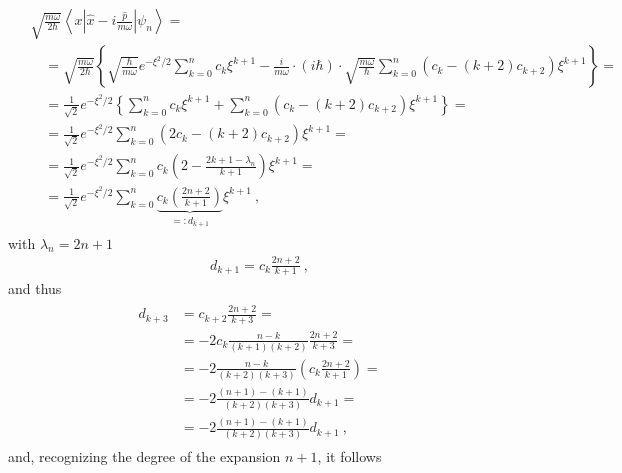 \documentclass[letterpaper,10pt,english]{jupyterBook}
\begin{document}
\begin{equation*}
\begin{split}\begin{aligned}
  & \sqrt{\frac{m \omega}{2 \hbar}} \left\langle x \left| \hat{x} - i \frac{\hat{p}}{m \omega} \right| \psi_n \right\rangle = \\
  & \quad = \sqrt{\frac{m \omega}{2 \hbar}} \left\{ \sqrt{\frac{\hbar}{m \omega}} e^{-\xi^2/2} \sum_{k=0}^{n} c_k \xi^{k+1} - \frac{i}{m \omega} \cdot \left( i \hbar \right) \cdot\sqrt{\frac{m\omega}{\hbar}} \sum_{k=0}^{n} \left( c_k - (k+2) c_{k+2} \right) \xi^{k+1} \right\} = \\
  & \quad = \frac{1}{\sqrt{2}} e^{-\xi^2/2} \left\{ \sum_{k=0}^{n} c_k \xi^{k+1} + \sum_{k=0}^{n} \left( c_k - (k+2) c_{k+2} \right) \xi^{k+1} \right\} = \\
  & \quad = \frac{1}{\sqrt{2}} e^{-\xi^2/2} \sum_{k=0}^{n} \left( 2 c_k - (k+2) c_{k+2} \right) \xi^{k+1} = \\
  & \quad = \frac{1}{\sqrt{2}} e^{-\xi^2/2} \sum_{k=0}^{n} c_k \left( 2 - \frac{2k+1-\lambda_n}{k+1} \right) \xi^{k+1} = \\
  & \quad = \frac{1}{\sqrt{2}} e^{-\xi^2/2} \sum_{k=0}^{n} \underbrace{c_k \left( \frac{2 n + 2}{k+1} \right)}_{=:d_{k+1}} \xi^{k+1} \ ,
\end{aligned}\end{split}
\end{equation*}
\sphinxAtStartPar
with \(\lambda_n = 2 n + 1\)
\begin{equation*}
\begin{split}d_{k+1} = c_k \frac{2n+2}{k+1} \ ,\end{split}
\end{equation*}
\sphinxAtStartPar
and thus
\begin{equation*}
\begin{split}\begin{aligned}
  d_{k+3}
  & = c_{k+2} \frac{2n+2}{k+3} = \\
  & = -2 c_{k} \frac{n-k}{(k+1)(k+2)} \frac{2n+2}{k+3} = \\
  & = -2 \frac{n-k}{(k+2)(k+3)} \left( c_k \frac{2n+2}{k+1} \right) = \\
  & = -2 \frac{(n+1)-(k+1)}{(k+2)(k+3)} d_{k+1} = \\
  & = -2 \frac{(n+1)-(k+1)}{(k+2)(k+3)} d_{k+1} \ ,
\end{aligned}\end{split}
\end{equation*}
\sphinxAtStartPar
and, recognizing the degree of the expansion \(n+1\), it follows
\end{document}
